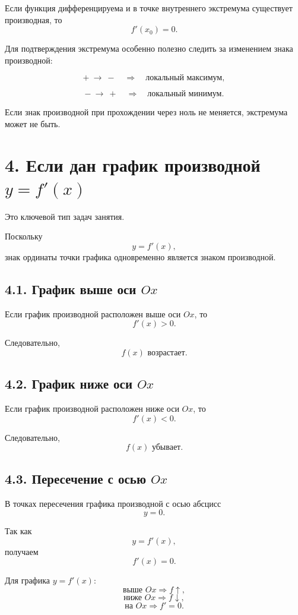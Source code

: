 \documentclass[a4paper,12pt]{article}
\begin{document}
Если функция дифференцируема и в точке внутреннего экстремума существует производная, то
\[
f'(x_0)=0.
\]

Для подтверждения экстремума особенно полезно следить за изменением знака производной:

\[
+\ \longrightarrow\ -
\quad\Rightarrow\quad
\text{локальный максимум},
\]

\[
-\ \longrightarrow\ +
\quad\Rightarrow\quad
\text{локальный минимум}.
\]

Если знак производной при прохождении через ноль не меняется, экстремума может не быть.

\section*{4. Если дан график производной \(y=f'(x)\)}

Это ключевой тип задач занятия.

Поскольку
\[
y=f'(x),
\]
знак ординаты точки графика одновременно является знаком производной.

\subsection*{4.1. График выше оси \(Ox\)}

Если график производной расположен выше оси \(Ox\), то
\[
f'(x)>0.
\]

Следовательно,
\[
f(x)\text{ возрастает}.
\]

\subsection*{4.2. График ниже оси \(Ox\)}

Если график производной расположен ниже оси \(Ox\), то
\[
f'(x)<0.
\]

Следовательно,
\[
f(x)\text{ убывает}.
\]

\subsection*{4.3. Пересечение с осью \(Ox\)}

В точках пересечения графика производной с осью абсцисс
\[
y=0.
\]

Так как
\[
y=f'(x),
\]
получаем
\[
f'(x)=0.
\]

\begin{keybox}
Для графика \(y=f'(x)\):
\[
\text{выше }Ox \Rightarrow f\uparrow,
\]
\[
\text{ниже }Ox \Rightarrow f\downarrow,
\]
\[
\text{на }Ox \Rightarrow f'=0.
\]
\end{keybox}
\end{document}
